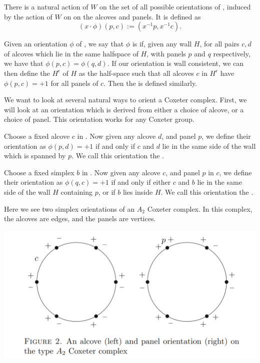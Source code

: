 \documentclass[11pt]{article}
\begin{document}
There is a natural action of $W$ on the set of all possible orientations of \sg, induced by the action of $W$ on on the alcoves and panels. It is defined as 
\[(x\cdot\phi)(p,c):=(x^{-1}p,x^{-1}c).\]

\begin{definition}\cite[?]{SHA}
    Given an orientation $\phi$ of \sg, we say that $\phi$ is  if, given any wall $H$, for all pairs $c,d$ of alcoves which lie in the same halfspace of $H$, with panels $p$ and $q$ respectively, we have that $\phi(p,c)=\phi(q,d)$. If our orientation is wall consistent, we can then define the  $H^{\epsilon}$ of $H$ as the half-space such that all alcoves $c$ in $H^{\epsilon}$ have $\phi(p,c)=+1$ for all panels of $c$. Then the  is defined similarly.
\end{definition}

We want to look at several natural ways to orient a Coxeter complex. First, we will look at an orientation which is derived from either a choice of alcove, or a choice of panel. This orientation works for any Coxeter group.

\begin{definition}\cite[?]{SHA}
    Choose a fixed alcove $c$ in \sg. Now given any alcove $d$, and panel $p$, we define their orientation as $\phi(p,d)=+1$ if and only if $c$ and $d$ lie in the same side of the wall which is spanned by $p$. We call this orientation the .
\end{definition}


\begin{definition}\cite[?]{SHA}
    Choose a fixed simplex $b$ in \sg. Now given any alcove $c$, and panel $p$ in $c$, we define their orientation as $\phi(q,c)=+1$ if and only if either $c$ and $b$ lie in the same side of the wall $H$ containing $p$, or if $b$ lies inside $H$. We call this orientation the .
\end{definition}
\begin{example}
    Here we see two simplex orientations of an $A_2$ Coxeter complex. In this complex, the alcoves are edges, and the panels are vertices.
\end{example}
\includegraphics[scale=0.6]{Screenshot 2023-02-03 102201.png}\\
\end{document}
